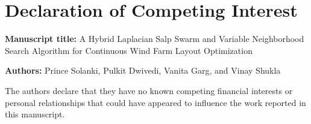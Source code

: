 \documentclass[11pt]{article}
\begin{document}
\section*{Declaration of Competing Interest}
\textbf{Manuscript title:} A Hybrid Laplacian Salp Swarm and Variable Neighborhood Search Algorithm for Continuous Wind Farm Layout Optimization

\medskip
\textbf{Authors:} Prince Solanki, Pulkit Dwivedi, Vanita Garg, and Vinay Shukla

\medskip
The authors declare that they have no known competing financial interests or personal relationships that could have appeared to influence the work reported in this manuscript.
\end{document}
